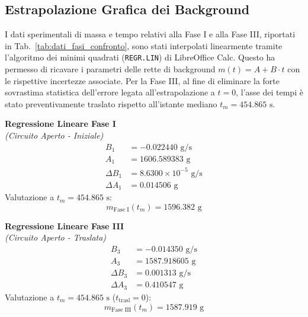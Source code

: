 \documentclass[a4paper,12pt]{article}
\begin{document}
\subsection{Estrapolazione Grafica dei Background}
I dati sperimentali di massa e tempo relativi alla Fase I e alla Fase III, riportati in Tab.~\ref{tab:dati_fasi_confronto}, sono stati interpolati linearmente tramite l'algoritmo dei minimi quadrati (\texttt{REGR.LIN}) di LibreOffice Calc. Questo ha permesso di ricavare i parametri delle rette di background $m(t) = A + B \cdot t$ con le rispettive incertezze associate. Per la Fase III, al fine di eliminare la forte sovrastima statistica dell'errore legata all'estrapolazione a $t=0$, l'asse dei tempi è stato preventivamente traslato rispetto all'istante mediano $t_m = 454.865\text{ s}$.

\noindent
\begin{minipage}[t]{0.48\textwidth}
    \centering
    \textbf{Regressione Lineare Fase I} \\
    \textit{(Circuito Aperto - Iniziale)}
    \begin{align*}
        B_1 &= -0.022440 \text{ g/s} \\
        A_1 &= 1606.589383 \text{ g} \\
        \Delta B_1 &= 8.6300 \times 10^{-5} \text{ g/s} \\
        \Delta A_1 &= 0.014506 \text{ g}
    \end{align*}
    Valutazione a $t_m = 454.865\text{ s}$:
    \begin{equation*}
        m_{\text{Fase I}}(t_m) = 1596.382\text{ g}
    \end{equation*}
\end{minipage}
\hfill
\begin{minipage}[t]{0.48\textwidth}
    \centering
    \textbf{Regressione Lineare Fase III} \\
    \textit{(Circuito Aperto - Traslata)}
    \begin{align*}
        B_3 &= -0.014350 \text{ g/s} \\
        A_3 &= 1587.918605 \text{ g} \\
        \Delta B_3 &= 0.001313 \text{ g/s} \\
        \Delta A_3 &= 0.410547 \text{ g}
    \end{align*}
    Valutazione a $t_m = 454.865\text{ s}$ ($t_{\text{trasl}} = 0$):
    \begin{equation*}
        m_{\text{Fase III}}(t_m) = 1587.919\text{ g}
    \end{equation*}
\end{minipage}
\end{document}
